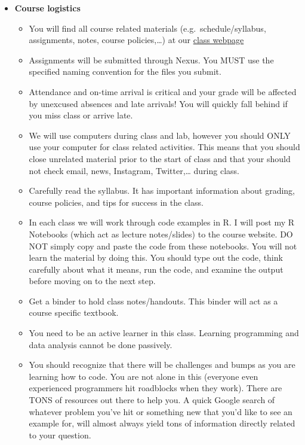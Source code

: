\documentclass[
]{article}
\providecommand{\tightlist}{%
  \setlength{\itemsep}{0pt}\setlength{\parskip}{0pt}}
\begin{document}
\begin{itemize}
\tightlist
\item
  \textbf{Course logistics}

  \begin{itemize}
  \tightlist
  \item
    You will find all course related materials (e.g.~schedule/syllabus,
    assignments, notes, course policies,\ldots) at our
    \href{https://stahlm.github.io/ENS_215/Winter_2025/Home.html}{class
    webpage}
  \item
    Assignments will be submitted through Nexus. You MUST use the
    specified naming convention for the files you submit.
  \item
    Attendance and on-time arrival is critical and your grade will be
    affected by unexcused absences and late arrivals! You will quickly
    fall behind if you miss class or arrive late.
  \item
    We will use computers during class and lab, however you should ONLY
    use your computer for class related activities. This means that you
    should close unrelated material prior to the start of class and that
    your should not check email, news, Instagram, Twitter,\ldots{}
    during class.
  \item
    Carefully read the syllabus. It has important information about
    grading, course policies, and tips for success in the class.
  \item
    In each class we will work through code examples in R. I will post
    my R Notebooks (which act as lecture notes/slides) to the course
    website. DO NOT simply copy and paste the code from these notebooks.
    You will not learn the material by doing this. You should type out
    the code, think carefully about what it means, run the code, and
    examine the output before moving on to the next step.
  \item
    Get a binder to hold class notes/handouts. This binder will act as a
    course specific textbook.
  \item
    You need to be an active learner in this class. Learning programming
    and data analysis cannot be done passively.\\
  \item
    You should recognize that there will be challenges and bumps as you
    are learning how to code. You are not alone in this (everyone even
    experienced programmers hit roadblocks when they work). There are
    TONS of resources out there to help you. A quick Google search of
    whatever problem you've hit or something new that you'd like to see
    an example for, will almost always yield tons of information
    directly related to your question.
  \end{itemize}
\end{itemize}
\end{document}
